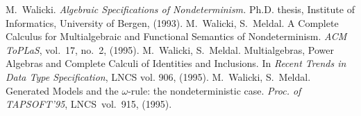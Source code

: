 \begin{thebibliography}{BGW80}
 M.~Walicki.
{\em Algebraic Specifications of Nondeterminism.} Ph.D. thesis, Institute of Informatics, University of Bergen, (1993). 
 M.~Walicki, S.~Meldal. A Complete Calculus for 
  Multialgebraic and Functional Semantics of Nondeterminism. 
  {\em ACM ToPLaS}, vol.~17, no.~2, (1995).
 M.~Walicki, S.~Meldal. Multialgebras, Power Algebras 
and Complete Calculi of Identities and Inclusions. In
{\em Recent Trends in Data Type Specification}, LNCS vol. 906, (1995).
 M.~Walicki, S.~Meldal. Generated Models and the $\omega$-rule:
the nondeterministic case. {\em Proc. of  TAPSOFT'95}, LNCS~vol.~915, (1995).
 \end{thebibliography}


